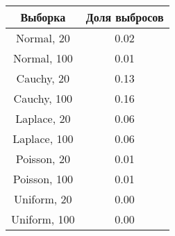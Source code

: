 \begin{tabular}{|c|c|}
\hline
 Выборка & Доля выбросов\\
\hline
Normal, 20 & 0.02\\
\hline
Normal, 100 & 0.01\\
\hline
Cauchy, 20 & 0.13\\
\hline
Cauchy, 100 & 0.16\\
\hline
Laplace, 20 & 0.06\\
\hline
Laplace, 100 & 0.06\\
\hline
Poisson, 20 & 0.01\\
\hline
Poisson, 100 & 0.01\\
\hline
Uniform, 20 & 0.00\\
\hline
Uniform, 100 & 0.00\\
\hline
\end{tabular}

